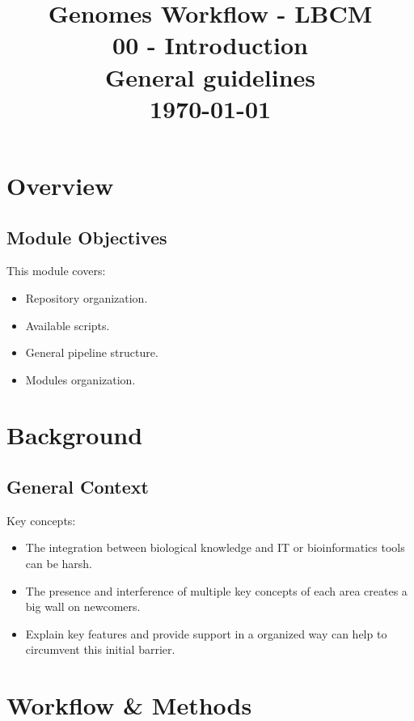 \documentclass[a4paper,11pt]{article}
\title{
    \vfill
    \textcolor{noteblue}{\Huge Genomes Workflow - LBCM}\\
    \vspace{5.0cm}
    \textcolor{sidenotegray}{\huge 00 - Introduction}\\
    \vspace{1.5cm}
    \textcolor{sidenotegray}{\LARGE General guidelines}\\
    \vspace{5.0cm}
    \textcolor{sidenotegray}{\large \today}
    \vfill
}
\author{}
\date{}
\begin{document}
\maketitle
\thispagestyle{empty}
\newpage
\tableofcontents
\newpage
\section{Overview}

\subsection{Module Objectives}

This module covers:
\begin{itemize}
    \item Repository organization.
    \item Available scripts.
    \item General pipeline structure.
    \item Modules organization.
\end{itemize}

\section{Background}

\subsection{General Context}

Key concepts:
\begin{itemize}
    \item The integration between biological knowledge and IT or
        bioinformatics tools can be harsh.
    \item The presence and interference of multiple key concepts of each area
        creates a big wall on newcomers.
    \item Explain key features and provide support in a organized way can help
        to circumvent this initial barrier.
\end{itemize}

\section{Workflow \& Methods}
\end{document}
